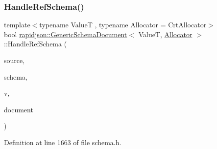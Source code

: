 \subsubsection{\texorpdfstring{HandleRefSchema()}{HandleRefSchema()}}
{\footnotesize\ttfamily template$<$typename ValueT , typename Allocator  = Crt\+Allocator$>$ \\
bool \mbox{\hyperlink{classrapidjson_1_1_generic_schema_document}{rapidjson\+::\+Generic\+Schema\+Document}}$<$ ValueT, \mbox{\hyperlink{classrapidjson_1_1_allocator}{Allocator}} $>$\+::Handle\+Ref\+Schema (\begin{DoxyParamCaption}\item[{const \mbox{\hyperlink{classrapidjson_1_1_generic_schema_document_a61540c0f8aa542760ae03257a0e6dab7}{Pointer\+Type}} \&}]{source,  }\item[{const \mbox{\hyperlink{classrapidjson_1_1_generic_schema_document_aaf4e7f371de938025f7ed4be3b83266e}{Schema\+Type}} $\ast$$\ast$}]{schema,  }\item[{const \mbox{\hyperlink{classrapidjson_1_1_generic_schema_document_a87eb1db271e7f57442802a5f4f6178f3}{Value\+Type}} \&}]{v,  }\item[{const \mbox{\hyperlink{classrapidjson_1_1_generic_schema_document_a87eb1db271e7f57442802a5f4f6178f3}{Value\+Type}} \&}]{document }\end{DoxyParamCaption})\hspace{0.3cm}{\ttfamily [private]}}



Definition at line 1663 of file schema.\+h.


